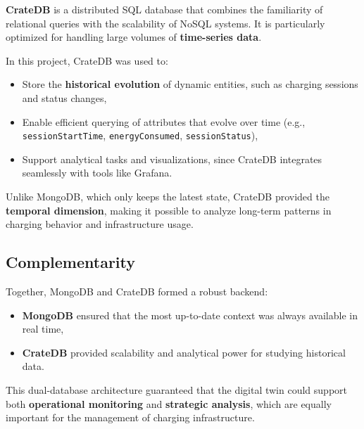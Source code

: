 \textbf{CrateDB} is a distributed SQL database that combines the familiarity of relational queries with the scalability of NoSQL systems.  
It is particularly optimized for handling large volumes of \textbf{time-series data}.  

In this project, CrateDB was used to:
\begin{itemize}
    \item Store the \textbf{historical evolution} of dynamic entities, such as charging sessions and status changes,
    \item Enable efficient querying of attributes that evolve over time (e.g., \texttt{sessionStartTime}, \texttt{energyConsumed}, \texttt{sessionStatus}),
    \item Support analytical tasks and visualizations, since CrateDB integrates seamlessly with tools like Grafana.
\end{itemize}

Unlike MongoDB, which only keeps the latest state, CrateDB provided the \textbf{temporal dimension}, making it possible to analyze long-term patterns in charging behavior and infrastructure usage.

\subsection*{Complementarity}
Together, MongoDB and CrateDB formed a robust backend:
\begin{itemize}
    \item \textbf{MongoDB} ensured that the most up-to-date context was always available in real time,
    \item \textbf{CrateDB} provided scalability and analytical power for studying historical data.
\end{itemize}

This dual-database architecture guaranteed that the digital twin could support both \textbf{operational monitoring} and \textbf{strategic analysis}, which are equally important for the management of charging infrastructure.

